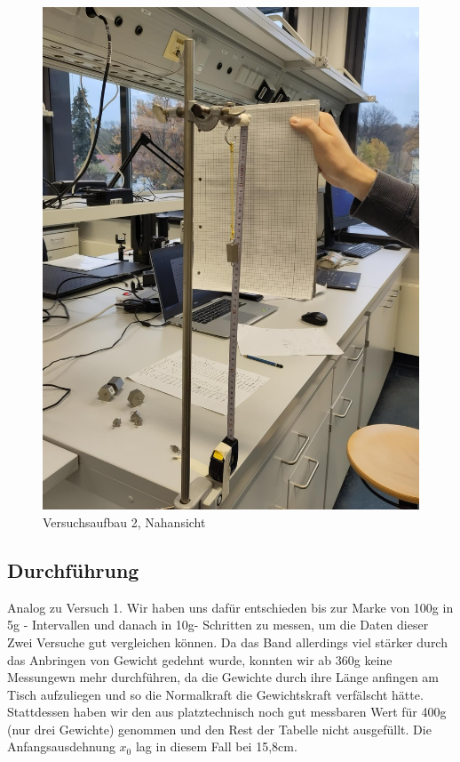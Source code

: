 \documentclass[
  9pt,
]{article}
\begin{document}
\begin{figure}
\centering
\includegraphics[width=\textwidth,height=0.2\textheight]{Bilder/V2B2.jpeg}
\caption{Versuchsaufbau 2, Nahansicht}
\end{figure}

\hypertarget{durchfuxfchrung-1}{%
\subsection{Durchführung}\label{durchfuxfchrung-1}}

Analog zu Versuch 1. Wir haben uns dafür entschieden bis zur Marke von
100g in 5g - Intervallen und danach in 10g- Schritten zu messen, um die
Daten dieser Zwei Versuche gut vergleichen können. Da das Band
allerdings viel stärker durch das Anbringen von Gewicht gedehnt wurde,
konnten wir ab 360g keine Messungewn mehr durchführen, da die Gewichte
durch ihre Länge anfingen am Tisch aufzuliegen und so die Normalkraft
die Gewichtskraft verfälscht hätte. Stattdessen haben wir den aus
platztechnisch noch gut messbaren Wert für 400g (nur drei Gewichte)
genommen und den Rest der Tabelle nicht ausgefüllt. Die
Anfangsausdehnung \(x_0\) lag in diesem Fall bei 15,8cm.
\end{document}
